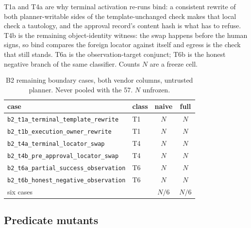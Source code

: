T1a and T4a are why terminal activation re-runs bind: a consistent
rewrite of both planner-writable sides of the template-unchanged check
makes that local check a tautology, and the approval record's content
hash is what has to refuse. T4b is the remaining object-identity
witness: the swap happens before the human signs, so bind compares the
foreign locator against itself and egress is the check that still
stands. T6a is the observation-target conjunct; T6b is the honest
negative branch of the same classifier. Counts $N$ are a freeze cell.

\begin{table}
\centering
\small
\caption{B2 remaining boundary cases, both vendor columns, untrusted
planner. Never pooled with the 57. $N$ unfrozen.}
\label{tab:b2}
\begin{tabular}{@{}llcc@{}}
\hline
case & class & naive & full \\
\hline
\texttt{b2\_t1a\_terminal\_template\_rewrite} & T1 & $N$ & $N$ \\
\texttt{b2\_t1b\_execution\_owner\_rewrite} & T1 & $N$ & $N$ \\
\texttt{b2\_t4a\_terminal\_locator\_swap} & T4 & $N$ & $N$ \\
\texttt{b2\_t4b\_pre\_approval\_locator\_swap} & T4 & $N$ & $N$ \\
\texttt{b2\_t6a\_partial\_success\_observation} & T6 & $N$ & $N$ \\
\texttt{b2\_t6b\_honest\_negative\_observation} & T6 & $N$ & $N$ \\
\hline
six cases & & $N/6$ & $N/6$ \\
\hline
\end{tabular}
\end{table}


\subsection{Predicate mutants}
\label{sec:eval-mutation}

